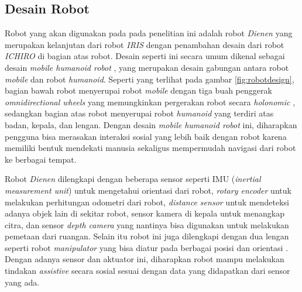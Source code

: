 \subsection{Desain Robot}
\label{subsec:robotdesign}



Robot yang akan digunakan pada pada penelitian ini adalah robot \emph{Dienen} yang merupakan kelanjutan dari robot \emph{IRIS} \citep{dikairono2020}\citep{zanuar2019} dengan penambahan desain dari robot \emph{ICHIRO} \citep{muhtadin2019} di bagian atas robot.
Desain seperti ini secara umum dikenal sebagai desain \emph{mobile humanoid robot} \citep{mohamed2012},
  yang merupakan desain gabungan antara robot \emph{mobile} dan robot \emph{humanoid}.
Seperti yang terlihat pada gambar \ref{fig:robotdesign},
  bagian bawah robot menyerupai robot \emph{mobile} dengan tiga buah penggerak \emph{omnidirectional wheels} yang memungkinkan pergerakan robot secara \emph{holonomic} \citep{oliveira2008},
  sedangkan bagian atas robot menyerupai robot \emph{humanoid} yang terdiri atas badan, kepala, dan lengan.
Dengan desain \emph{mobile humanoid robot} ini,
  diharapkan pengguna bisa merasakan interaksi sosial yang lebih baik dengan robot karena memiliki bentuk mendekati manusia \citep{rossi2018} sekaligus mempermudah navigasi dari robot ke berbagai tempat.

Robot \emph{Dienen} dilengkapi dengan beberapa sensor seperti IMU (\emph{inertial measurement unit}) untuk mengetahui orientasi dari robot,
  \emph{rotary encoder} untuk melakukan perhitungan odometri dari robot,
  \emph{distance sensor} untuk mendeteksi adanya objek lain di sekitar robot, sensor kamera di kepala untuk menangkap citra,
  dan sensor \emph{depth camera} yang nantinya bisa digunakan untuk melakukan pemetaan dari ruangan.
Selain itu robot ini juga dilengkapi dengan dua lengan seperti robot \emph{manipulator} yang bisa diatur pada berbagai posisi dan orientasi \citep{iqbal2012}.
Dengan adanya sensor dan aktuator ini,
  diharapkan robot mampu melakukan tindakan \emph{assistive} secara sosial sesuai dengan data yang didapatkan dari sensor yang ada.

